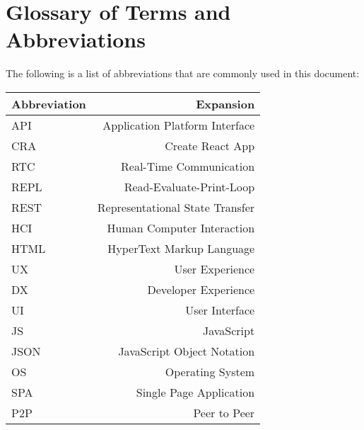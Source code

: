 \section{Glossary of Terms and Abbreviations}
The following is a list of abbreviations that are commonly used in this document:

\begin{table}[h]
    \centering
    \begin{tabulary}{\textwidth}{l r}
        \hline
        \hline
        \textbf{Abbreviation} & \textbf{Expansion}\\
        \hline
        \hline
        API & Application Platform Interface\\
        
        CRA & Create React App\\
        
        RTC & Real-Time Communication\\
        
        REPL & Read-Evaluate-Print-Loop\\
        
        REST & Representational State Transfer\\
        
        HCI & Human Computer Interaction\\
        
        HTML & HyperText Markup Language\\
        
        UX & User Experience\\
        
        DX & Developer Experience\\
        
        UI & User Interface\\
        
        JS & JavaScript\\
        
        JSON & JavaScript Object Notation\\
        
        OS & Operating System\\
        
        SPA & Single Page Application\\
        
        P2P & Peer to Peer\\
        

\end{tabulary}
\end{table}
